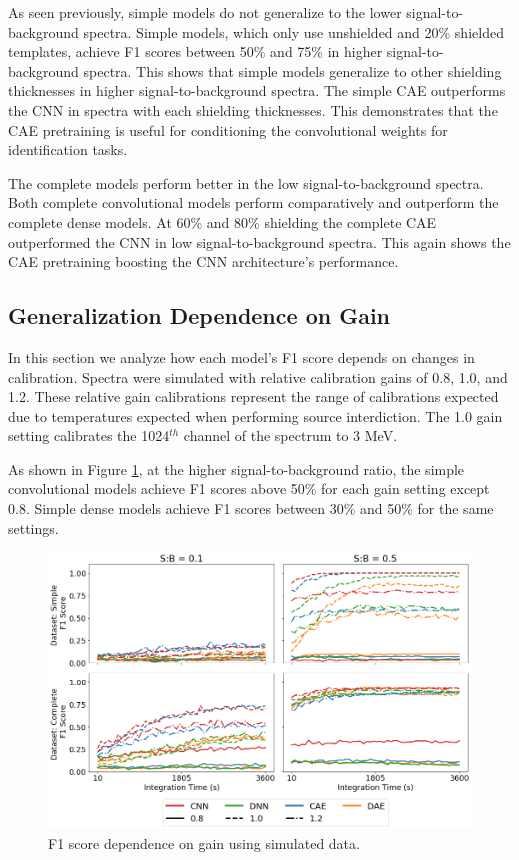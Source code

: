 As seen previously, simple models do not generalize to the lower signal-to-background spectra. Simple models, which only use unshielded and 20\% shielded templates, achieve F1 scores between 50\% and 75\% in higher signal-to-background spectra. This shows that simple models generalize to other shielding thicknesses in higher signal-to-background spectra. The simple CAE outperforms the CNN in spectra with each shielding thicknesses. This demonstrates that the CAE pretraining is useful for conditioning the convolutional weights for identification tasks. 

The complete models perform better in the low signal-to-background spectra. Both complete convolutional models perform comparatively and outperform the complete dense models. At 60\% and 80\% shielding the complete CAE outperformed the CNN in low signal-to-background spectra. This again shows the CAE pretraining boosting the CNN architecture's performance.





\subsection{Generalization Dependence on Gain}

In this section we analyze how each model's F1 score depends on changes in calibration. Spectra were simulated with relative calibration gains of 0.8, 1.0, and 1.2. These relative gain calibrations represent the range of calibrations expected due to temperatures expected when performing source interdiction. The 1.0 gain setting calibrates the 1024$^{th}$ channel of the spectrum to 3 MeV.

As shown in Figure \ref{fig:sim-generalization-cal}, at the higher signal-to-background ratio, the simple convolutional models achieve F1 scores above 50\% for each gain setting except 0.8. Simple dense models achieve F1 scores between 30\% and 50\% for the same settings.

\begin{figure}[H]
	\centering
	\includegraphics[width=1.0\linewidth]{images/sim-generalization-cal}
	\caption{F1 score dependence on gain using simulated data.}
	\label{fig:sim-generalization-cal}
\end{figure}

